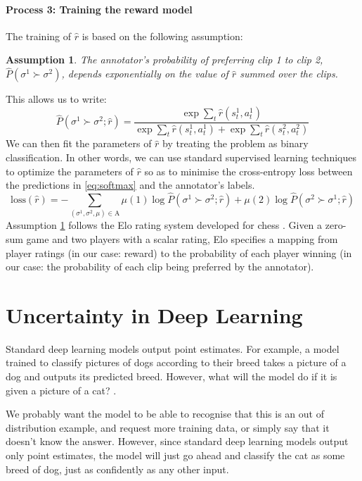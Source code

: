 \documentclass[11pt, a4paper, bibliography=totoc]{report}
\newcommand{\rp}{\hat{r}}
\newcommand{\annbuff}{\mathrm{A}}
\newtheorem{assumption}{Assumption}
\begin{document}
\subsubsection{Process 3: Training the reward model}
The training of $ \rp $ is based on the following assumption:
\begin{assumption} \label{assumption:1}
	The annotator's probability of preferring clip 1 to clip 2, $ \hat{P}(\sigma^1 \succ \sigma^2) $, depends exponentially on the value of $ \hat{r} $ summed over the clips.
\end{assumption}
This allows us to write:
\begin{equation} \label{eq:softmax}
\hat{P}(\sigma^1 \succ \sigma^2 ; \rp) = \frac{\exp \sum_t \hat{r}(s_t^1, a_t^1)}{\exp \sum_t \hat{r}(s_t^1, a_t^1) + \exp \sum_t \hat{r}(s_t^2, a_t^2)}
\end{equation}
We can then fit the parameters of $ \rp $ by treating the problem as binary classification. In other words, we can use standard supervised learning techniques to optimize the parameters of $ \rp $ so as to minimise the cross-entropy loss between the predictions in \ref{eq:softmax} and the annotator's labels.
\begin{equation} \label{eq:loss}
\text{loss}(\hat{r}) = -\sum_{(\sigma^1, \sigma^2, \mu) \in \annbuff} \mu(1) \log \hat{P}(\sigma^1 \succ \sigma^2 ; \rp) + \mu(2)\log \hat{P}(\sigma^2 \succ \sigma^1 ; \rp)
\end{equation}
Assumption \ref{assumption:1} follows the Elo rating system developed for chess \cite{elo1978rating}. Given a zero-sum game and two players with a scalar rating, Elo specifies a mapping from player ratings (in our case: reward) to the probability of each player winning (in our case: the probability of each clip being preferred by the annotator).

\chapter{Uncertainty in Deep Learning}
Standard deep learning models output point estimates. For example, a model trained to classify pictures of dogs according to their breed takes a picture of a dog and outputs its predicted breed. However, what will the model do if it is given a picture of a cat? \cite{Gal2017a}.

We probably want the model to be able to recognise that this is an out of distribution example, and request more training data, or simply say that it doesn't know the answer. However, since standard deep learning models output only point estimates, the model will just go ahead and classify the cat as some breed of dog, just as confidently as any other input.
\end{document}
